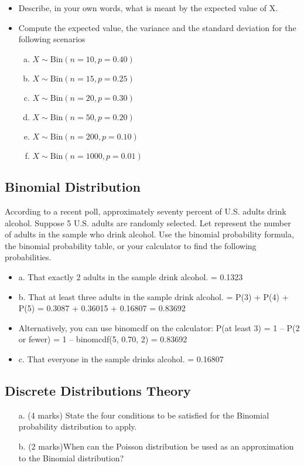 \documentclass[]{article}
\begin{document}
\begin{itemize}
\item Describe, in your own words, what is meant by the expected value of X.

\item Compute the expected value, the variance and the standard deviation for the following scenarios

\begin{enumerate}[(a)]
\item $X \sim \mbox{Bin}(n=10,p=0.40)$
\item $X \sim \mbox{Bin}(n=15,p=0.25)$
\item $X \sim \mbox{Bin}(n=20,p=0.30)$
\item $X \sim \mbox{Bin}(n=50,p=0.20)$
\item $X \sim \mbox{Bin}(n=200,p=0.10)$
\item $X \sim \mbox{Bin}(n=1000,p=0.01)$
\end{enumerate}

\end{itemize}


\subsection{Binomial Distribution}
According to a recent poll, approximately seventy percent of U.S. adults drink alcohol.
Suppose 5 U.S. adults are randomly selected. Let represent the number of adults in the sample who drink 
alcohol. Use the binomial probability formula, the binomial probability table, or your calculator to find the 
following probabilities.
\begin{itemize}
\item a. That exactly 2 adults in the sample drink alcohol.
= 0.1323
\item b. That at least three adults in the sample drink alcohol.
= P(3) + P(4) + P(5) = 0.3087 + 0.36015 + 0.16807 = 0.83692
\item Alternatively, you can use binomcdf on the calculator:
P(at least 3) = 1 – P(2 or fewer) = 1 – binomcdf(5, 0.70, 2) = 0.83692
\item c. That everyone in the sample drinks alcohol.
= 0.16807
\end{itemize}





\subsection*{Discrete Distributions Theory }
\begin{itemize}
\item[a.] (4 marks) State the four conditions to be satisfied for the Binomial probability
distribution to apply.

\item[b.] (2 marks)When can the Poisson distribution be used as an approximation to the
Binomial distribution?
\end{itemize}
\end{document}

